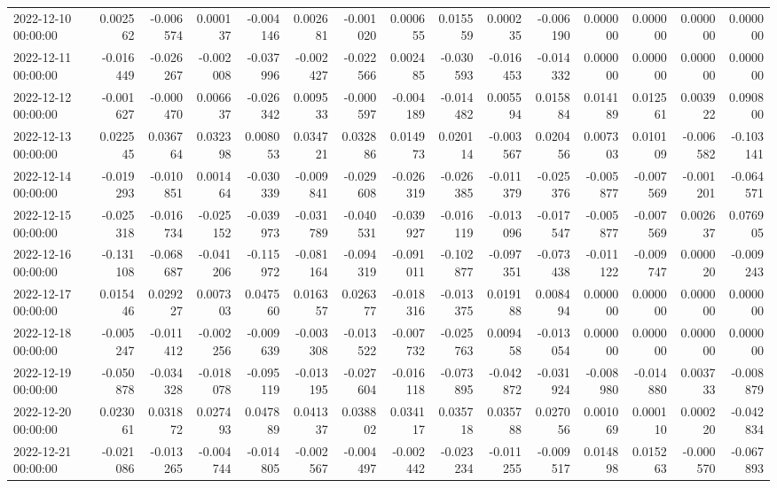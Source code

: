 \begin{tabular}{lrrrrrrrrrrrrrr}
2022-12-10 00:00:00 & 0.002562 & -0.006574 & 0.000137 & -0.004146 & 0.002681 & -0.001020 & 0.000655 & 0.015559 & 0.000235 & -0.006190 & 0.000000 & 0.000000 & 0.000000 & 0.000000 \\
2022-12-11 00:00:00 & -0.016449 & -0.026267 & -0.002008 & -0.037996 & -0.002427 & -0.022566 & 0.002485 & -0.030593 & -0.016453 & -0.014332 & 0.000000 & 0.000000 & 0.000000 & 0.000000 \\
2022-12-12 00:00:00 & -0.001627 & -0.000470 & 0.006637 & -0.026342 & 0.009533 & -0.000597 & -0.004189 & -0.014482 & 0.005594 & 0.015884 & 0.014189 & 0.012561 & 0.003922 & 0.090800 \\
2022-12-13 00:00:00 & 0.022545 & 0.036764 & 0.032398 & 0.008053 & 0.034721 & 0.032886 & 0.014973 & 0.020114 & -0.003567 & 0.020456 & 0.007303 & 0.010109 & -0.006582 & -0.103141 \\
2022-12-14 00:00:00 & -0.019293 & -0.010851 & 0.001464 & -0.030339 & -0.009841 & -0.029608 & -0.026319 & -0.026385 & -0.011379 & -0.025376 & -0.005877 & -0.007569 & -0.001201 & -0.064571 \\
2022-12-15 00:00:00 & -0.025318 & -0.016734 & -0.025152 & -0.039973 & -0.031789 & -0.040531 & -0.039927 & -0.016119 & -0.013096 & -0.017547 & -0.005877 & -0.007569 & 0.002637 & 0.076905 \\
2022-12-16 00:00:00 & -0.131108 & -0.068687 & -0.041206 & -0.115972 & -0.081164 & -0.094319 & -0.091011 & -0.102877 & -0.097351 & -0.073438 & -0.011122 & -0.009747 & 0.000020 & -0.009243 \\
2022-12-17 00:00:00 & 0.015446 & 0.029227 & 0.007303 & 0.047560 & 0.016357 & 0.026377 & -0.018316 & -0.013375 & 0.019188 & 0.008494 & 0.000000 & 0.000000 & 0.000000 & 0.000000 \\
2022-12-18 00:00:00 & -0.005247 & -0.011412 & -0.002256 & -0.009639 & -0.003308 & -0.013522 & -0.007732 & -0.025763 & 0.009458 & -0.013054 & 0.000000 & 0.000000 & 0.000000 & 0.000000 \\
2022-12-19 00:00:00 & -0.050878 & -0.034328 & -0.018078 & -0.095119 & -0.013195 & -0.027604 & -0.016118 & -0.073895 & -0.042872 & -0.031924 & -0.008980 & -0.014880 & 0.003733 & -0.008879 \\
2022-12-20 00:00:00 & 0.023061 & 0.031872 & 0.027493 & 0.047889 & 0.041337 & 0.038802 & 0.034117 & 0.035718 & 0.035788 & 0.027056 & 0.001069 & 0.000110 & 0.000220 & -0.042834 \\
2022-12-21 00:00:00 & -0.021086 & -0.013265 & -0.004744 & -0.014805 & -0.002567 & -0.004497 & -0.002442 & -0.023234 & -0.011255 & -0.009517 & 0.014898 & 0.015263 & -0.000570 & -0.067893 \\

\end{tabular}
